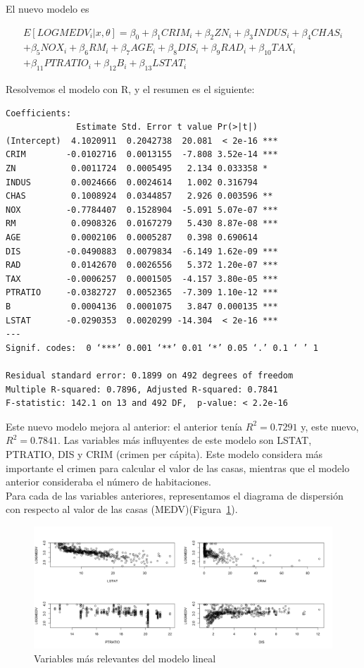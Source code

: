 \documentclass[12pt,a4paper,twoside,openright,titlepage,final]{article}
\begin{document}
El nuevo modelo es

\begin{multline*}
E[LOGMEDV_i |x, \theta] = \beta_0 + \beta_1 CRIM_i + \beta_2 ZN_i + \beta_3 INDUS_i + \beta_4 CHAS_i \\ + \beta_5 NOX_i + \beta_6 RM_i + \beta_7 AGE_i + \beta_8 DIS_i + \beta_9 RAD_i + \beta_{10} TAX_i \\ +  \beta_{11} PTRATIO_i + \beta_{12} B_i + \beta_{13} LSTAT_i
\end{multline*}

Resolvemos el modelo con R, y el resumen es el siguiente:

\begin{verbatim}
Coefficients:
              Estimate Std. Error t value Pr(>|t|)    
(Intercept)  4.1020911  0.2042738  20.081  < 2e-16 ***
CRIM        -0.0102716  0.0013155  -7.808 3.52e-14 ***
ZN           0.0011724  0.0005495   2.134 0.033358 *  
INDUS        0.0024666  0.0024614   1.002 0.316794    
CHAS         0.1008924  0.0344857   2.926 0.003596 ** 
NOX         -0.7784407  0.1528904  -5.091 5.07e-07 ***
RM           0.0908326  0.0167279   5.430 8.87e-08 ***
AGE          0.0002106  0.0005287   0.398 0.690614    
DIS         -0.0490883  0.0079834  -6.149 1.62e-09 ***
RAD          0.0142670  0.0026556   5.372 1.20e-07 ***
TAX         -0.0006257  0.0001505  -4.157 3.80e-05 ***
PTRATIO     -0.0382727  0.0052365  -7.309 1.10e-12 ***
B            0.0004136  0.0001075   3.847 0.000135 ***
LSTAT       -0.0290353  0.0020299 -14.304  < 2e-16 ***
---
Signif. codes:  0 ‘***’ 0.001 ‘**’ 0.01 ‘*’ 0.05 ‘.’ 0.1 ‘ ’ 1 

Residual standard error: 0.1899 on 492 degrees of freedom
Multiple R-squared: 0.7896,	Adjusted R-squared: 0.7841 
F-statistic: 142.1 on 13 and 492 DF,  p-value: < 2.2e-16 
\end{verbatim}

Este nuevo modelo mejora al anterior: el anterior tenía $R^2 = 0.7291$ y, este nuevo, $R^2 = 0.7841$. Las variables más influyentes de este modelo son LSTAT, PTRATIO, DIS y CRIM (crimen per cápita). Este modelo considera más importante el crimen para calcular el valor de las casas, mientras que el modelo anterior consideraba el número de habitaciones.\\

Para cada de las variables anteriores, representamos el diagrama de dispersión con respecto al valor de las casas (MEDV)(Figura~\ref{fig:variables_relevantes}).

\begin{figure}[tbph!]\centering
\includegraphics[width=0.9\linewidth]{imagenes/variables_relevantes}
\caption{Variables más relevantes del modelo lineal}
\label{fig:variables_relevantes}
\end{figure}
\end{document}
